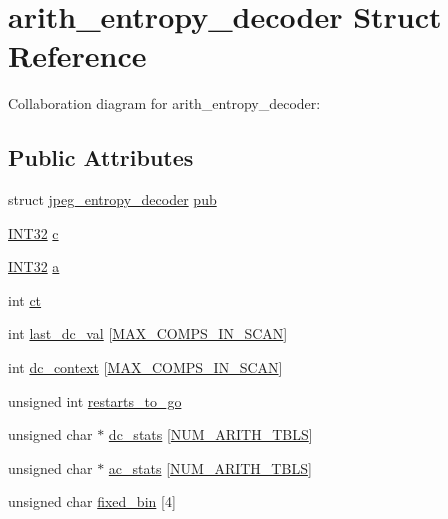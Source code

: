 \hypertarget{structarith__entropy__decoder}{}\section{arith\+\_\+entropy\+\_\+decoder Struct Reference}
\label{structarith__entropy__decoder}


Collaboration diagram for arith\+\_\+entropy\+\_\+decoder\+:
\subsection*{Public Attributes}
\begin{DoxyCompactItemize}
\item 
struct \hyperlink{structjpeg__entropy__decoder}{jpeg\+\_\+entropy\+\_\+decoder} \hyperlink{structarith__entropy__decoder_a26f1da810c05744076bad3072983d0d1}{pub}
\item 
\hyperlink{jmorecfg_8h_a0cb58e7e6f0bad369840a52e54a56ae0}{I\+N\+T32} \hyperlink{structarith__entropy__decoder_abad1e8f477d4015c7069855679885618}{c}
\item 
\hyperlink{jmorecfg_8h_a0cb58e7e6f0bad369840a52e54a56ae0}{I\+N\+T32} \hyperlink{structarith__entropy__decoder_afb33bbe1e85d3d76b8b119a46db68a77}{a}
\item 
int \hyperlink{structarith__entropy__decoder_a6c907da02b3db27a4b0f025733a44109}{ct}
\item 
int \hyperlink{structarith__entropy__decoder_afd8cad23cfc049f4ae748308f239bb20}{last\+\_\+dc\+\_\+val} \mbox{[}\hyperlink{jpeglib_8h_adc7013da016c19051dc623fb3d8b35b4}{M\+A\+X\+\_\+\+C\+O\+M\+P\+S\+\_\+\+I\+N\+\_\+\+S\+C\+A\+N}\mbox{]}
\item 
int \hyperlink{structarith__entropy__decoder_a0b9a2123aec7d879cff09e315530d5e8}{dc\+\_\+context} \mbox{[}\hyperlink{jpeglib_8h_adc7013da016c19051dc623fb3d8b35b4}{M\+A\+X\+\_\+\+C\+O\+M\+P\+S\+\_\+\+I\+N\+\_\+\+S\+C\+A\+N}\mbox{]}
\item 
unsigned int \hyperlink{structarith__entropy__decoder_ab587034265fc6747822cfb11167e4004}{restarts\+\_\+to\+\_\+go}
\item 
unsigned char $\ast$ \hyperlink{structarith__entropy__decoder_a0a8fd2a17e1e838e9194fab8579463d5}{dc\+\_\+stats} \mbox{[}\hyperlink{jpeglib_8h_a4efb0fccc8d9db72ca18f32a26fad6ab}{N\+U\+M\+\_\+\+A\+R\+I\+T\+H\+\_\+\+T\+B\+L\+S}\mbox{]}
\item 
unsigned char $\ast$ \hyperlink{structarith__entropy__decoder_ad24b1d5f8dae5839bca9cc749bf9f06e}{ac\+\_\+stats} \mbox{[}\hyperlink{jpeglib_8h_a4efb0fccc8d9db72ca18f32a26fad6ab}{N\+U\+M\+\_\+\+A\+R\+I\+T\+H\+\_\+\+T\+B\+L\+S}\mbox{]}
\item 
unsigned char \hyperlink{structarith__entropy__decoder_a3e88e1dc54dd33d41dd937a8dc03342a}{fixed\+\_\+bin} \mbox{[}4\mbox{]}
\end{DoxyCompactItemize}


